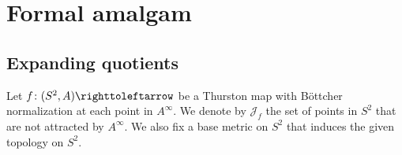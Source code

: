 \documentclass{amsart}
\theoremstyle{plain}
\newtheorem{theorem}{Theorem}[section]
\theoremstyle{definition}
\theoremstyle{remark}
\newcommand{\Jul}{{\mathcal J}}
\newcommand{\CC}{{\mathcal C}}
\newcommand\selfmap{\righttoleftarrow}
\begin{document}
\section{Formal amalgam}
\label{sec: geom amal}
%
%
%
%
%
%
%
%
%
%
%


 \subsection{Expanding quotients}
Let $f\colon(S^2,A)\selfmap$ be a Thurston map with B\"ottcher normalization at each point in $A^\infty$. We denote by $\Jul_f$ the set of points in $S^2$ that are not attracted by $A^\infty$.  We also fix a base metric on $S^2$ that induces the given topology on $S^2$.
\end{document}
